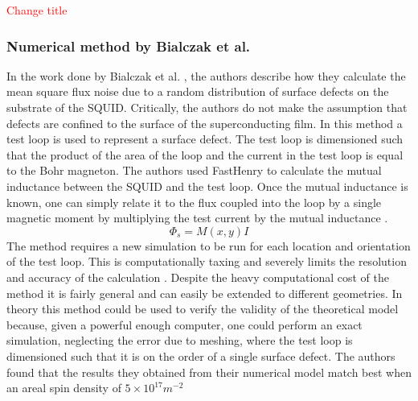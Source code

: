 \textcolor{red}{Change title}
\subsubsection*{Numerical method by Bialczak et al.}
In the work done by Bialczak et al. \cite{BialczakTestLoop}, the authors describe how they calculate the mean square flux noise due to a random distribution of surface defects on the substrate of the SQUID. Critically, the authors do not make the assumption that defects are confined to the surface of the superconducting film. In this method a test loop is used to represent a surface defect. The test loop is dimensioned such that the product of the area of the loop and the current in the test loop is equal to the Bohr magneton. The authors used FastHenry to calculate the mutual inductance between the SQUID and the test loop. Once the mutual inductance is known, one can simply relate it to the flux coupled into the loop by a single magnetic moment by multiplying the test current by the mutual inductance \cite{BialczakTestLoop}. 
\begin{equation}
    \Phi_s = M(x,y)I
    \label{eq:FluxCoupleBial}
\end{equation}
The method requires a new simulation to be run for each location and orientation of the test loop. This is computationally taxing and severely limits the resolution and accuracy of the calculation \cite{fluxNoiseSquidsStevenAnton}. Despite the heavy computational cost of the method it is fairly general and can easily be extended to different geometries. In theory this method could be used to verify the validity of the theoretical model because, given a powerful enough computer, one could perform an exact simulation, neglecting the error due to meshing, where the test loop is dimensioned such that it is on the order of a single surface defect. The authors found that the results they obtained from their numerical model match best when an areal spin density of $5\times10^{17}\si{m^{-2}}$

